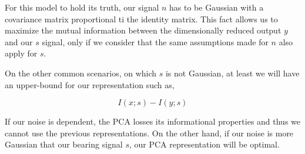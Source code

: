 For this model to hold its truth, our signal $n$ has to be Gaussian with a covariance matrix proportional ti the identity matrix. This fact allows us to maximize the mutual information between the dimensionally reduced output $y$ and our $s$ signal, only if we consider that the same assumptions made for $n$ also apply for $s$. \par

On the other common scenarios, on which $s$ is not Gaussian, at least we will have an upper-bound for our representation such as,

\begin{equation}
\label{eq:pca_upper_bound}
I(x;s) - I(y;s)
\end{equation}

If our noise is dependent, the PCA losses its informational properties and thus we cannot use the previous representations. On the other hand, if our noise is more Gaussian that our bearing signal $s$, our PCA representation will be optimal.
